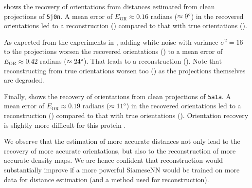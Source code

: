  shows the recovery of orientations from distances estimated from clean projections of \texttt{5j0n}.
A mean error of $E_\text{OR} \approx 0.16$ radians ($\approx 9\degree$) in the recovered orientations led to a  reconstruction () compared to that with true orientations ().

As expected from the experiments in , adding white noise with variance $\sigma^2=16$ to the projections worsen the recovered orientations () to a mean error of $E_\text{OR} \approx 0.42$ radians ($\approx 24\degree$).
That leads to a  reconstruction ().
Note that reconstructing from true orientations worsen too  () as the projections themselves are degraded.

Finally,  shows the recovery of orientations from clean projections of \texttt{5a1a}.
A mean error of $E_\text{OR} \approx 0.19$ radians ($\approx 11\degree$) in the recovered orientations led to a  reconstruction () compared to that with true orientations ().
Orientation recovery is slightly more difficult for this protein  .

We observe that the estimation of more accurate distances not only lead to the recovery of more accurate orientations, but also to the reconstruction of more accurate density maps.
We are hence confident that reconstruction would substantially improve if a more powerful SiameseNN would be trained on more data for distance estimation (and a  method used for reconstruction).
